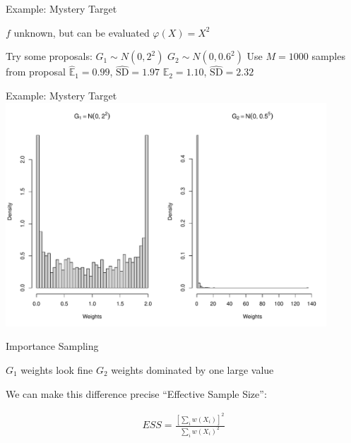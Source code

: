\documentclass[14pt]{beamer}
\newcommand{\bE}{\mathbb{E}}
\begin{document}
\begin{frame}{Example: Mystery Target}
    \begin{outline}
        \1 $f$ unknown, but can be evaluated 
        \1 $\varphi(X) = X^2$ \newline

        \1 Try some proposals:
            \2 $G_1 \sim N(0, 2^2)$
            \2 $G_2 \sim N(0, 0.6^2)$ \newline
        \1 Use $M=1000$ samples from proposal
            \2 $\hat{\bE}_1 = 0.99$, $\hat{\text{SD}} = 1.97$
            \2 $\hat{\bE}_2 = 1.10$, $\hat{\text{SD}} = 2.32$
    \end{outline}    
\end{frame}

\begin{frame}{Example: Mystery Target}
    \centering
    \includegraphics[height=0.9\textheight, width=0.9\textwidth, keepaspectratio]{Figures/Wt Hist.pdf}
\end{frame}

\begin{frame}{Importance Sampling}
    \begin{outline}
        \1 $G_1$ weights look fine
        \1 $G_2$ weights dominated by one large value \newline

        \1 We can make this difference precise
        \1 ``Effective Sample Size'':
    \end{outline}
    \begin{gather*}
        ESS = \frac{\left[\sum_i w(X_i)\right]^2}{\sum_i w(X_i)^2}
    \end{gather*}
\end{frame}
\end{document}
